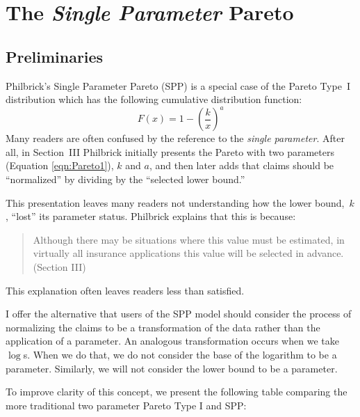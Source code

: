 \section{The \emph{Single Parameter} Pareto}\label{sec:theSPP}
\subsection{Preliminaries}
Philbrick's Single Parameter Pareto (SPP) is a special case of the Pareto Type~I distribution which has the following cumulative distribution function:
\begin{equation}
F(x) = 1 - \left(\frac{k}{x} \right)^a\label{eqn:Pareto1}
\end{equation}
Many readers are often confused by the reference to the \emph{single parameter}. After all, in Section~III Philbrick initially presents the Pareto with two parameters (Equation \ref{eqn:Pareto1}), $k$ and $a$, and then later adds that claims should be ``normalized'' by dividing by the ``selected lower bound.''

This presentation leaves many readers not understanding how the lower bound,~$k$,  ``lost'' its parameter status. Philbrick explains that this is because:
\begin{quote}
	Although there may be situations where this value must be estimated, in virtually all insurance applications this value will be selected in advance. (Section III)
\end{quote}
This explanation often leaves readers less than satisfied.

I offer the alternative that users of the SPP model should consider the process of normalizing the claims to be a transformation of the data rather than the application of a parameter. An analogous transformation occurs when we take $\log$s. When we do that, we do not consider the base of the logarithm to be a parameter. Similarly, we will not consider the lower bound to be a parameter.

To improve clarity of this concept, we present the following table comparing the more traditional two parameter Pareto Type I and SPP:

